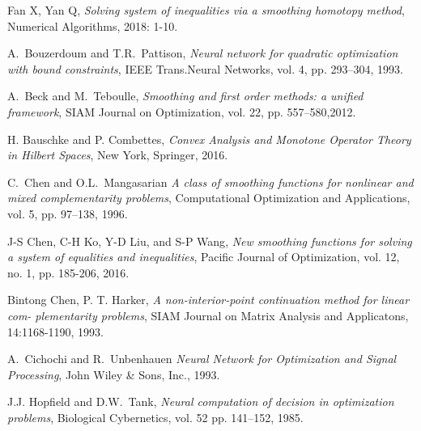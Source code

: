 \documentclass[12pt]{article}
\begin{document}
 \begin{thebibliography}{1}
 {\sc Fan X, Yan Q},
 {\em Solving system of inequalities via a smoothing homotopy method},
  Numerical Algorithms, 2018: 1-10.

 {\sc A.\ Bouzerdoum and T.R.\ Pattison},
 {\em Neural network for quadratic optimization with bound constraints},
 IEEE Trans.Neural Networks, vol. 4, pp. 293--304, 1993.

 {\sc A.\ Beck and M.\ Teboulle},
 {\em Smoothing and first order methods: a unified framework},
 SIAM Journal on Optimization, vol. 22, pp. 557--580,2012.

 {\sc H. Bauschke and P. Combettes},
 {\em  Convex Analysis and Monotone Operator Theory in Hilbert Spaces},
 New York, Springer, 2016.



 {\sc C.\ Chen and O.L.\ Mangasarian}
 {\em A class of smoothing functions for nonlinear and mixed complementarity problems},
 Computational Optimization and Applications, vol. 5, pp. 97--138, 1996.

 {\sc J-S Chen, C-H Ko, Y-D Liu, and S-P Wang},
 {\em New smoothing functions for solving a system of equalities and inequalities},
  Pacific Journal of Optimization, vol. 12, no. 1, pp. 185-206, 2016.

  {\sc Bintong Chen, P. T. Harker},
  {\em  A non-interior-point continuation method for linear com- plementarity problems},
   SIAM Journal on Matrix Analysis and Applicatons, 14:1168-1190, 1993.

 {\sc A.\ Cichochi and R.\ Unbenhauen}
 {\em Neural Network for Optimization and Signal Processing},
 John Wiley \& Sons, Inc., 1993.

 {\sc J.J. Hopfield and D.W.\ Tank},
 {\em Neural computation of decision in optimization problems},
 Biological Cybernetics, vol. 52 pp. 141--152, 1985.


\end{thebibliography}
\end{document}
